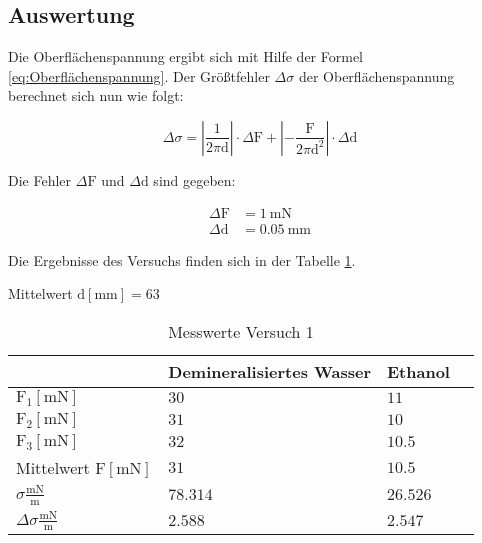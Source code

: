         \subsection{Auswertung}

            Die Oberflächenspannung ergibt sich mit Hilfe der Formel \ref{eq:Oberflächenspannung}.
            Der Größtfehler $\Delta \sigma$ der Oberflächenspannung berechnet sich nun wie folgt:

            \begin{equation}
                \Delta \sigma = \left| \frac{1}{2 \pi \mathrm{d}} \right| \cdot \Delta \mathrm{F} + \left| -\frac{\mathrm{F}}{2 \pi \mathrm{d}^2} \right| \cdot \Delta \mathrm{d} 
                \label{eq:Größtfehler}
            \end{equation}

            Die Fehler $\Delta \mathrm{F}$ und $\Delta \mathrm{d}$ sind gegeben:

            \begin{equation}
                \begin{aligned}
                    \Delta \mathrm{F} &= 1\ \mathrm{mN}\\
                    \Delta \mathrm{d} &= 0.05\ \mathrm{mm}
                \end{aligned}
                \label{eq:Fehler_V1}
            \end{equation}

            Die Ergebnisse des Versuchs finden sich in der Tabelle \ref{tab:Versuch1_Ergebnisse}.

            Mittelwert $\mathrm{d[mm]} = 63$\\

            \begin{table}[H]
                \centering
                \caption{Messwerte Versuch 1}
                \label{tab:Versuch1_Ergebnisse}
                \vspace{1em}
                \begin{tabular}{|l|l|l|l|}
                    \hline
                    & Demineralisiertes Wasser & Ethanol \\
                    \hline \hline
                    $\mathrm{F_1 [mN]}$ & $30$ & $11$\\
                    \hline
                    $\mathrm{F_2 [mN]}$ & $31$ & $10$\\
                    \hline
                    $\mathrm{F_3 [mN]}$ & $32$ & $10.5$\\
                    \hline
                    Mittelwert $\mathrm{F [mN]}$ & $31$ & $10.5$\\
                    \hline
                    $\sigma \frac{\mathrm{mN}}{\mathrm{m}}$ & $78.314$ & $26.526$\\
                    \hline
                    $\Delta \sigma \frac{\mathrm{mN}}{\mathrm{m}}$ & $2.588$ & $2.547$\\
                    \hline
                \end{tabular}
            \end{table}
        
